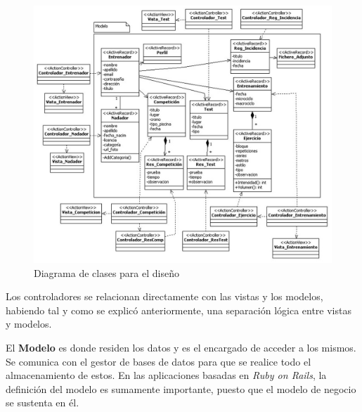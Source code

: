 			\begin{figure}[H]
			  \centering
			    \includegraphics[width=16cm]{./eps/di_diagclases/di_diagclases.eps}
			  \caption{Diagrama de clases para el diseño}
			  \label{fig:di_diag_clases}
			\end{figure}
			
			Los controladores se relacionan directamente con las vistas y los modelos, habiendo tal y como se explicó anteriormente, una separación lógica entre vistas y modelos.
			
			El {\bf Modelo} es donde residen los datos y es el encargado de acceder a los mismos. Se comunica con el gestor de bases de datos para que se realice todo el almacenamiento de estos. En las aplicaciones basadas en {\it Ruby on Rails}, la definición del modelo es sumamente importante, puesto que el modelo de negocio se sustenta en él.

